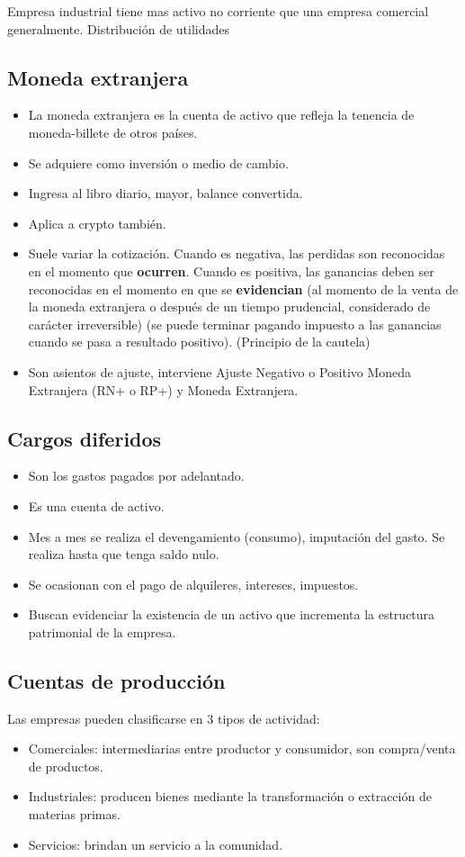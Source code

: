 \documentclass[titlepage,a4paper]{article}
\begin{document}
Empresa industrial tiene mas activo no corriente que una empresa comercial generalmente.
Distribución de utilidades

\subsection{Moneda extranjera}
\begin{itemize}
    \item La moneda extranjera es la cuenta de activo que refleja la tenencia de moneda-billete de otros países.
    \item Se adquiere como inversión o medio de cambio.
    \item Ingresa al libro diario, mayor, balance convertida.
    \item Aplica a crypto también.
    \item Suele variar la cotización. Cuando es negativa, las perdidas son reconocidas en el momento que \textbf{ocurren}. Cuando es positiva, las ganancias deben ser reconocidas en el momento en que se \textbf{evidencian} (al momento de la venta de la moneda extranjera o después de un tiempo prudencial, considerado de carácter irreversible) (se puede terminar pagando impuesto a las ganancias cuando se pasa a resultado positivo). (Principio de la cautela)
    \item Son asientos de ajuste, interviene Ajuste Negativo o Positivo Moneda Extranjera (RN+ o RP+) y Moneda Extranjera.
\end{itemize}

\subsection{Cargos diferidos}
\begin{itemize}
\item Son los gastos pagados por adelantado. 
\item Es una cuenta de activo.
\item Mes a mes se realiza el devengamiento (consumo), imputación del gasto. Se realiza hasta que tenga saldo nulo.
\item Se ocasionan con el pago de alquileres, intereses, impuestos.
\item Buscan evidenciar la existencia de un activo que incrementa la estructura patrimonial de la empresa.
\end{itemize}

\subsection{Cuentas de producción} %
Las empresas pueden clasificarse en 3 tipos de actividad:
\begin{itemize}
\item Comerciales: intermediarias entre productor y consumidor, son compra/venta de productos.
\item Industriales: producen bienes mediante la transformación o extracción de materias primas.
\item Servicios: brindan un servicio a la comunidad.
\end{itemize}
\end{document}
